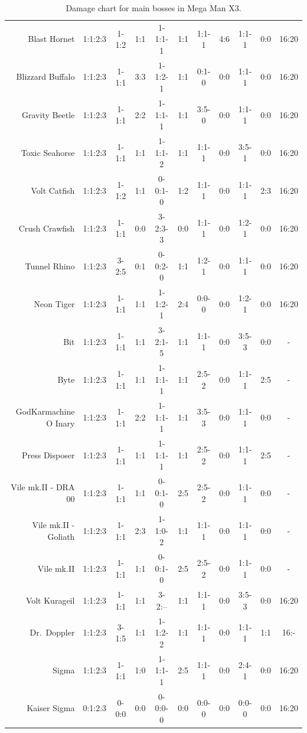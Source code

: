\begin{table}[htp]
{\begin{tabular}{r *{10}{c}}
			Blast Hornet&	 1:1:2:3& 1-1:2& 1:1 &  1-1:1-1& 1:1& 1:1-1& 4:6& 1:1-1& 0:0& 16:20\\
		Blizzard Buffalo &	 1:1:2:3& 1-1:1& 3:3 &  1-1:2-1& 1:1& 0:1-0& 0:0& 1:1-1& 0:0& 16:20\\
		Gravity Beetle &	 1:1:2:3& 1-1:1& 2:2 &  1-1:1-1& 1:1& 3:5-0& 0:0& 1:1-1& 0:0& 16:20\\
		Toxic Seahorse &	 1:1:2:3& 1-1:1& 1:1 &  1-1:1-2& 1:1& 1:1-1& 0:0& 3:5-1& 0:0& 16:20\\
		Volt Catfish	 &	 1:1:2:3& 1-1:2& 1:1 &  0-0:1-0& 1:2& 1:1-1& 0:0& 1:1-1& 2:3& 16:20\\
		Crush Crawfish	 &	 1:1:2:3& 1-1:1& 0:0 &  3-2:3-3& 0:0& 1:1-1& 0:0& 1:2-1& 0:0& 16:20\\
		Tunnel Rhino	 &	 1:1:2:3& 3-2:5& 0:1 &  0-0:2-0& 1:1& 1:2-1& 0:0& 1:1-1& 0:0& 16:20\\
		Neon Tiger		 &	 1:1:2:3& 1-1:1& 1:1 &  1-1:2-1& 2:4& 0:0-0& 0:0& 1:2-1& 0:0& 16:20\\
		Bit				 &	 1:1:2:3& 1-1:1& 1:1 &  3-2:1-5& 1:1& 1:1-1& 0:0& 3:5-3& 0:0& -\\
		Byte			 &	 1:1:2:3& 1-1:1& 1:1 &  1-1:1-1& 1:1& 2:5-2& 0:0& 1:1-1& 2:5& -\\
GodKarmachine O Inary 	 &	 1:1:2:3& 1-1:1& 2:2 &  1-1:1-1& 1:1& 3:5-3& 0:0& 1:1-1& 0:0& -\\
Press Disposer		 	 &	 1:1:2:3& 1-1:1& 1:1 &  1-1:1-1& 1:1& 2:5-2& 0:0& 1:1-1& 2:5& -\\
	Vile mk.II - DRA 00	 &	 1:1:2:3& 1-1:1& 1:1 &  0-0:1-0& 2:5& 2:5-2& 0:0& 1:1-1& 0:0& -\\
Vile mk.II - Goliath	 &	 1:1:2:3& 1-1:1& 2:3 &  1-1:0-2& 1:1& 1:1-1& 0:0& 1:1-1& 0:0& -\\
			Vile mk.II   &	 1:1:2:3& 1-1:1& 1:1 &  0-0:1-0& 2:5& 2:5-2& 0:0& 1:1-1& 0:0& -\\
		Volt Kurageil    &	 1:1:2:3& 1-1:1& 1:1 &  3-2:-- & 1:1& 1:1-1& 0:0&  3:5-3& 0:0& 16:20\\
		Dr.~Doppler   	 &	 1:1:2:3& 3-1:5& 1:1 &  1-1:2-2& 1:1& 1:1-1& 0:0&  1:1-1& 1:1& 16:-\\
		Sigma		   	 &	 1:1:2:3& 1-1:1& 1:0 &  1-1:1-1& 2:5& 1:1-1& 0:0&  2:4-1& 0:0& 16:20\\
		Kaiser Sigma	 &	 0:1:2:3& 0-0:0& 0:0 &  0-0:0-0& 0:0& 0:0-0& 0:0&  0:0-0& 0:0& 16:20\\
		\bottomrule
		\end{tabular}
	}	
	\caption{Damage chart for main bosses in Mega Man X3.}
\end{table}
